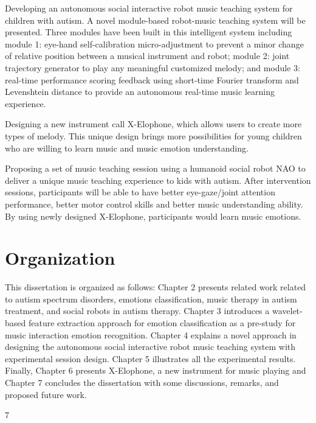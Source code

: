 \item 
Developing an autonomous social interactive robot music teaching system
for children with autism. A novel module-based robot-music teaching system will be presented. 
Three modules have been built in this intelligent system including module 1: eye-hand 
self-calibration micro-adjustment to prevent a minor change of relative position
between a musical instrument and robot; module 2: joint trajectory generator to 
play any meaningful customized melody; and module 3: real-time performance scoring 
feedback using short-time Fourier transform and Levenshtein distance to provide
an autonomous real-time music learning experience.\\

\item 
Designing a new instrument call X-Elophone, which allows users to create
more types of melody. This unique design brings more possibilities for young
children who are willing to learn music and music emotion understanding.\\


\item 
Proposing a set of music teaching session using a humanoid social robot
NAO to deliver a unique music teaching experience to kids with autism.
After intervention sessions, participants will be able to have better
eye-gaze/joint attention performance, better motor control skills and 
better music understanding ability. By using newly designed X-Elophone, 
participants would learn music
emotions.\\

\ei


\section{Organization}
This dissertation is organized as follows: Chapter 2 presents related work related to autism spectrum disorders, emotions classification, music
therapy in autism treatment, and social robots in autism therapy. Chapter 3 introduces a wavelet-based feature extraction approach for emotion 
classification as a pre-study for music interaction emotion recognition. Chapter 4 explains a novel approach in designing the autonomous social interactive robot
music teaching system with experimental session design. Chapter 5 illustrates all the experimental results. Finally, Chapter 6 presents X-Elophone, a new instrument for music playing and Chapter 7 concludes the dissertation with some discussions, remarks, and proposed future work.

7